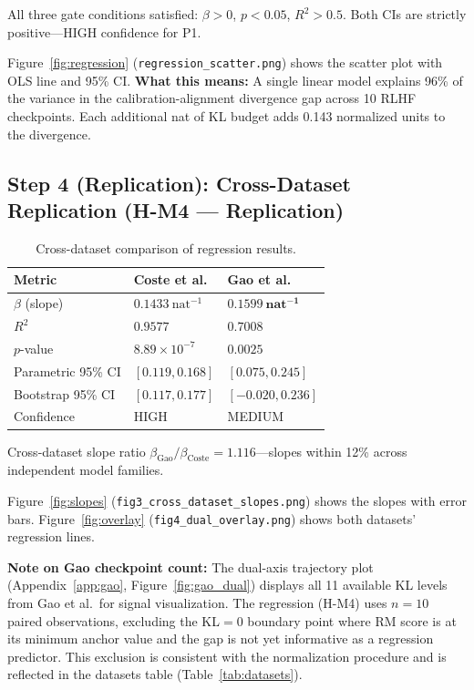 All three gate conditions satisfied: $\beta > 0$, $p < 0.05$, $R^2 > 0.5$. Both CIs are strictly positive---HIGH confidence for P1.

Figure~\ref{fig:regression} (\texttt{regression\_scatter.png}) shows the scatter plot with OLS line and 95\% CI. \textbf{What this means:} A single linear model explains 96\% of the variance in the calibration-alignment divergence gap across 10 RLHF checkpoints. Each additional nat of KL budget adds 0.143 normalized units to the divergence.

\subsection{Step 4 (Replication): Cross-Dataset Replication (H-M4 --- Replication)}
\label{subsec:replication}

\begin{table}[h]
\centering
\caption{Cross-dataset comparison of regression results.}
\label{tab:crossdataset}
\begin{tabular}{lll}
\toprule
Metric & Coste et al.~\cite{Coste2023Reward} & Gao et al.~\cite{Gao2023Scaling} \\
\midrule
$\beta$ (slope) & $0.1433\ \text{nat}^{-1}$ & $\mathbf{0.1599\ \text{nat}^{-1}}$ \\
$R^2$ & $0.9577$ & $0.7008$ \\
$p$-value & $8.89 \times 10^{-7}$ & $\mathbf{0.0025}$ \\
Parametric 95\% CI & $[0.119, 0.168]$ & $[0.075, 0.245]$ \\
Bootstrap 95\% CI & $[0.117, 0.177]$ & $[-0.020, 0.236]$ \\
Confidence & HIGH & MEDIUM \\
\bottomrule
\end{tabular}
\end{table}

Cross-dataset slope ratio $\beta_\text{Gao} / \beta_\text{Coste} = \mathbf{1.116}$---slopes within 12\% across independent model families.

Figure~\ref{fig:slopes} (\texttt{fig3\_cross\_dataset\_slopes.png}) shows the slopes with error bars. Figure~\ref{fig:overlay} (\texttt{fig4\_dual\_overlay.png}) shows both datasets' regression lines.

\textbf{Note on Gao checkpoint count:} The dual-axis trajectory plot (Appendix~\ref{app:gao}, Figure~\ref{fig:gao_dual}) displays all 11 available KL levels from Gao et al.\ for signal visualization. The regression (H-M4) uses $n=10$ paired observations, excluding the KL$=0$ boundary point where RM score is at its minimum anchor value and the gap is not yet informative as a regression predictor. This exclusion is consistent with the normalization procedure and is reflected in the datasets table (Table~\ref{tab:datasets}).

